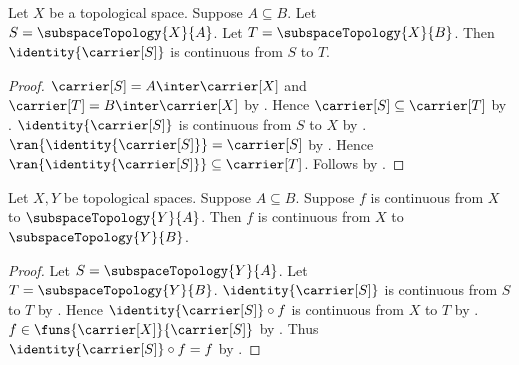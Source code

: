 \begin{theorem}\label{nested_subspace_inclusion_continuous}
    Let $X$ be a topological space.
    Suppose $A\subseteq B$.
    Let $S=\subspaceTopology{X}{A}$.
    Let $T=\subspaceTopology{X}{B}$.
    Then $\identity{\carrier[S]}$ is continuous from $S$ to $T$.
\end{theorem}
\begin{proof}
    $\carrier[S]=A\inter\carrier[X]$ and
        $\carrier[T]=B\inter\carrier[X]$
        by .
    Hence $\carrier[S]\subseteq\carrier[T]$
        by .
    $\identity{\carrier[S]}$ is continuous from $S$ to $X$
        by .
    $\ran{\identity{\carrier[S]}}=\carrier[S]$
        by .
    Hence
        $\ran{\identity{\carrier[S]}}\subseteq\carrier[T]$.
    Follows by .
\end{proof}

\begin{theorem}\label{continuous_codomain_weaken_to_nested_subspace}
    Let $X,Y$ be topological spaces.
    Suppose $A\subseteq B$.
    Suppose $f$ is continuous from $X$ to
        $\subspaceTopology{Y}{A}$.
    Then $f$ is continuous from $X$ to
        $\subspaceTopology{Y}{B}$.
\end{theorem}
\begin{proof}
    Let $S=\subspaceTopology{Y}{A}$.
    Let $T=\subspaceTopology{Y}{B}$.
    $\identity{\carrier[S]}$ is continuous from $S$ to $T$
        by .
    Hence $\identity{\carrier[S]}\circ f$ is continuous from $X$ to $T$
        by .
    $f\in\funs{\carrier[X]}{\carrier[S]}$
        by .
    Thus $\identity{\carrier[S]}\circ f=f$
        by .
\end{proof}
